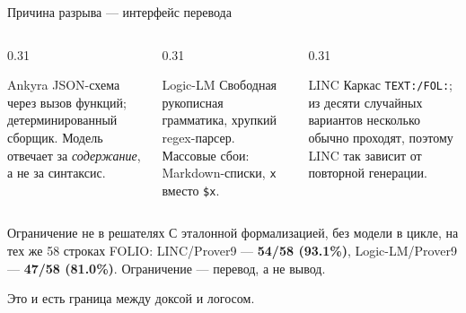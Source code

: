 \documentclass[aspectratio=169,11pt]{beamer}
\newcommand{\Logos}[1]{\textcolor{logoscolor}{#1}}
\begin{document}
\begin{frame}{Причина разрыва — интерфейс перевода}
  \footnotesize
  \begin{columns}[T,onlytextwidth]
    \begin{column}{0.31\textwidth}
      \begin{block}{\Logos{Ankyra}}
        JSON-схема через вызов функций; детерминированный сборщик.
        Модель отвечает за \emph{содержание}, а не за синтаксис.
      \end{block}
    \end{column}
    \begin{column}{0.31\textwidth}
      \begin{block}{Logic-LM}
        Свободная рукописная грамматика, хрупкий regex-парсер.
        Массовые сбои: Markdown-списки, \texttt{x} вместо \texttt{\$x}.
      \end{block}
    \end{column}
    \begin{column}{0.31\textwidth}
      \begin{block}{LINC}
        Каркас \texttt{TEXT:/FOL:}; из десяти случайных вариантов несколько
        обычно проходят, поэтому LINC так зависит от повторной генерации.
      \end{block}
    \end{column}
  \end{columns}

  \vspace{2mm}
  \begin{block}{Ограничение не в решателях}
    С эталонной формализацией, без модели в цикле, на тех же 58 строках FOLIO:
    LINC/Prover9 --- \textbf{54/58 (93.1\%)}, Logic-LM/Prover9 ---
    \textbf{47/58 (81.0\%)}. Ограничение --- перевод, а не вывод.
  \end{block}

  \vspace{1mm}
  \begin{center}
    \small Это и есть граница между доксой и логосом.
  \end{center}
\end{frame}
\end{document}
